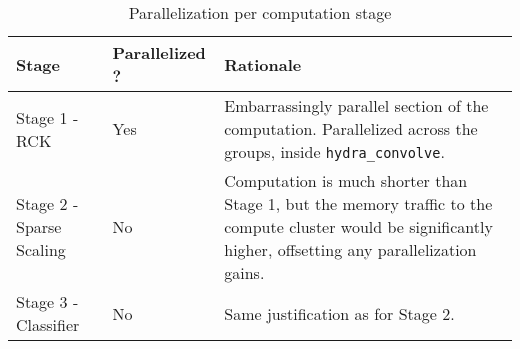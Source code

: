         \begin{table}[H]
        \begin{tabular}{||p{1.5in}|p{1.5in}|p{2.5in}||}
            \hline
            Stage & Parallelized ? & Rationale  \\

            \hline\hline
            Stage 1 - RCK            & Yes & Embarrassingly parallel section of the computation. Parallelized across the groups, inside \verb|hydra_convolve|.\\
            \hline
            Stage 2 - Sparse Scaling & No  & Computation is much shorter than Stage 1, but the memory traffic to the compute cluster would be significantly higher, offsetting any parallelization gains.\\
            \hline
            Stage 3 - Classifier     & No  & Same justification as for Stage 2.\\
            \hline
        \end{tabular}
        \caption{Parallelization per computation stage}
        \label{tbl:vect_summary}
        \end{table}